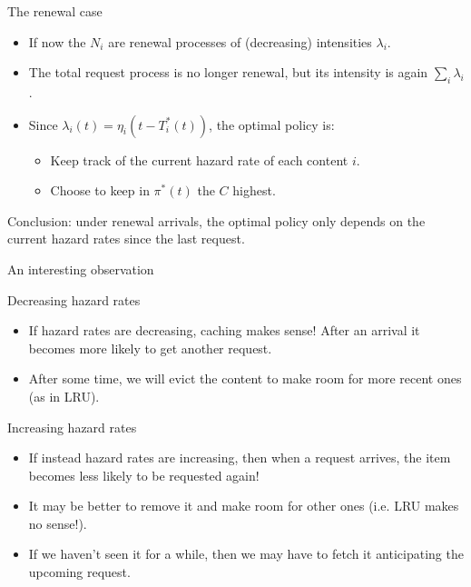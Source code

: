 \documentclass[aspectratio=169]{beamer}
\newenvironment*{myitem}[1][1.5em]{\begin{itemize}\setlength{\itemsep}{#1}}{\end{itemize}}
\begin{document}
\begin{frame}{The renewal case}
	\begin{myitem}[2em]
		\item If now the $N_i$ are renewal processes of (decreasing) intensities $\lambda_i$.
		\item The total request process is no longer renewal, but its intensity is again $\sum_i\lambda_i$.
		\item Since $\lambda_i(t) = \eta_i(t-T^*_i(t))$, the optimal policy is:
		\vspace{1em}
		\begin{itemize}
			\item Keep track of the \alert{current hazard rate} of each content $i$.
			\vspace{.5em}
			\item Choose to keep in $\pi^*(t)$ the $C$ highest. 
		\end{itemize}
	\end{myitem}

	\pause \vfill
	\alert{Conclusion:} under renewal arrivals, the optimal policy only depends on the current hazard rates since the last request.
\end{frame}

\begin{frame}{An interesting observation}

	\alert{Decreasing hazard rates}

	\begin{myitem}[1em]
		\item If hazard rates are \alert{decreasing}, caching makes sense! After an arrival it becomes more likely to get another request.
		\item After some time, we will evict the content to make room for more recent ones (as in LRU).
	\end{myitem}

	\pause\vfill
	\alert{Increasing hazard rates}

	\begin{myitem}[1em]
		\item If instead hazard rates are \alert{increasing}, then when a request arrives, the item becomes less likely to be requested again! 
		\item It may be better to remove it and make room for other ones (i.e. LRU makes no sense!).
		\item If we haven't seen it for a while, then we may have to fetch it \alert{anticipating} the upcoming request.
	\end{myitem}
\end{frame}
\end{document}
